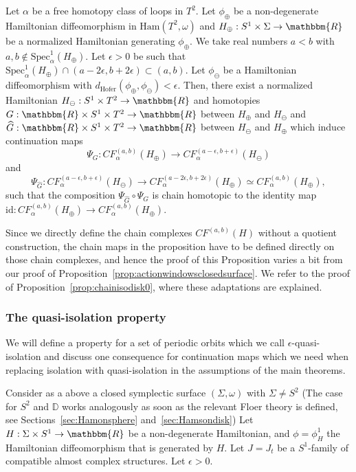 \documentclass[AHL,Unicode,longabstracts,published]{cedram}
\newcommand{\R}{\mathbbm{R}}
\newcommand{\D}{\mathbb{D}}
\newcommand{\Ham}{\mathrm{Ham}}
\newcommand{\hofer}{\mathrm{Hofer}}
\newcommand{\Spec}{\mathrm{Spec}}
\newcommand{\rid}{\mathrm{id}}
\newcommand{\hofer}{\mathrm{Hofer}}
\begin{document}
\begin{prop}\label{prop:chainisotorus}
Let $\alpha$ be a free homotopy class of loops in $T^2$. Let $\phi_\oplus$ be a non-degenerate Hamiltonian diffeomorphism in $\Ham(T^2,\omega)$ and $H_\oplus:S^1 \times \Sigma \to \R$ be a normalized Hamiltonian generating $\phi_\oplus$. We take real numbers $a<b$ with $a,b \notin \Spec_\alpha^1(H_\oplus)$. Let $\epsilon>0$ be such that $\Spec_\alpha^1(H_\oplus) \cap (a-2\epsilon, b+2\epsilon) \subset (a,b)$. Let $\phi_\ominus$ be a Hamiltonian diffeomorphism with $d_{\hofer}(\phi_\oplus, \phi_\ominus)< \epsilon$. Then, there exist a normalized Hamiltonian $H_\ominus: S^1 \times T^2 \to \R $ and homotopies $G: \R \times S^1 \times T^2 \to \R $ between $H_\oplus$ and $H_\ominus$ and $\widehat{G}: \R \times S^1 \times T^2 \to \R $ between $H_\ominus$ and $H_\oplus$ which induce continuation maps
\[
\Psi_G: CF_\alpha^{(a,b)}(H_\oplus) \to CF_\alpha^{(a-\epsilon, b+\epsilon)}(H_\ominus)
\]
and
\[
\Psi_{\widehat{G}}: CF_\alpha^{(a-\epsilon, b+\epsilon)}(H_\ominus) \to CF_\alpha^{(a-2\epsilon,b+2\epsilon)}(H_\oplus) \simeq CF_\alpha^{(a,b)}(H_\oplus),
\]
such that the composition $\Psi_{\widehat{G}}\circ \Psi_G$ is chain homotopic to the identity map ${\rid}: CF_\alpha^{(a,b)}(H_\oplus) \to CF_\alpha^{(a,b)}(H_\oplus) $.
\end{prop}

Since we directly define the chain complexes $CF^{(a,b)}(H)$ without a quotient construction, the chain maps in the proposition have to be defined directly on those chain complexes, and hence the proof of this Proposition varies a bit from our proof of Proposition~\ref{prop:actionwindowsclosedsurface}. We refer to the proof of Proposition~\ref{prop:chainisodisk0}, where these adaptations are explained.


\subsubsection{The quasi-isolation property}\label{sec:quasi-iso}

We will define a property for a set of periodic orbits which we call $\epsilon$-quasi-isolation and discuss one consequence for continuation maps which we need when replacing isolation with quasi-isolation in the assumptions of the main theorems.

Consider as a above a closed symplectic surface $(\Sigma, \omega)$ with $\Sigma \neq S^2$ (The case for $S^2$ and $\D$ works analogously as soon as the relevant Floer theory is defined, see Sections~\ref{sec:Hamonsphere} and~\ref{sec:Hamsondisk}) Let $H:\Sigma \times S^1 \to \R$ be a non-degenerate Hamiltonian, and $\phi= \phi^1_H$ the Hamiltonian diffeomorphism that is generated by $H$. Let $J = J_t$ be a $S^1$-family of compatible almost complex structures. Let $\epsilon>0$.
\end{document}
